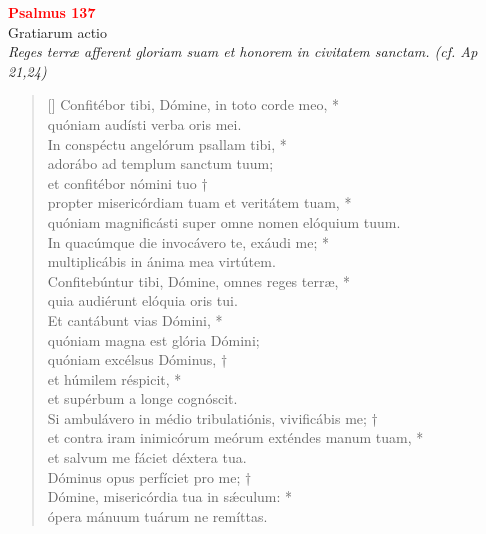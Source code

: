 


\def\greinitialformat#1{%
{\fontsize{39}{39}\selectfont #1}%
}




\vspace{0.3cm}
\begin{center}
 \textcolor{red}{\large \bf Psalmus 137}\\
Gratiarum actio\\
\textit{\small Reges terræ afferent gloriam suam et honorem in civitatem sanctam. (cf. Ap 21,24)}
\end{center}
\begin{verse}[\versewidth]
Confitébor tibi, Dómine, in toto corde meo, *\\
quóniam audísti verba oris mei.\\
\vin In conspéctu angelórum psallam tibi, *\\
\vin adorábo ad templum sanctum tuum;\\
et confitébor nómini tuo †\\
propter misericórdiam tuam et veritátem tuam, *\\
quóniam magnificásti super omne nomen elóquium tuum.\\
\vin In quacúmque die invocávero te, exáudi me; *\\
\vin multiplicábis in ánima mea virtútem.\\
Confitebúntur tibi, Dómine, omnes reges terræ, *\\
quia audiérunt elóquia oris tui.\\
\vin Et cantábunt vias Dómini, *\\
\vin quóniam magna est glória Dómini;\\
quóniam excélsus Dóminus, †\\
et húmilem réspicit, *\\
et supérbum a longe cognóscit.\\
\vin Si ambulávero in médio tribulatiónis, vivificábis me; †\\
\vin et contra iram inimicórum meórum exténdes manum tuam, *\\
\vin et salvum me fáciet déxtera tua.\\
Dóminus opus perfíciet pro me; †\\
Dómine, misericórdia tua in s\'{æ}culum: *\\
ópera mánuum tuárum ne remíttas.\\
\end{verse}
\vspace{1cm}


